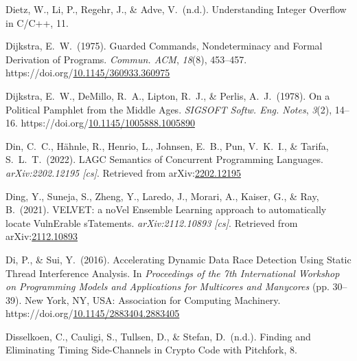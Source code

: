 \documentclass[12pt,twoside]{article}
\begin{document}
{\begin{thebibliography}{1079}
\mdbibitemlabel{}Dietz, W., Li, P., Regehr, J., \& Adve, V.~(n.d.). Understanding Integer Overﬂow in C/C++, 11.%

\mdbibitemlabel{}Dijkstra, E.~W.~(1975). Guarded Commands, Nondeterminacy and Formal Derivation of Programs. \emph{Commun. ACM}, \emph{18}(8), 453–457. https://doi.org/\href{https://dx.doi.org/10.1145/360933.360975}{10.1145/360933.360975}%

\mdbibitemlabel{}Dijkstra, E.~W., DeMillo, R.~A., Lipton, R.~J., \& Perlis, A.~J.~(1978). On a Political Pamphlet from the Middle Ages. \emph{SIGSOFT Softw. Eng. Notes}, \emph{3}(2), 14–16. https://doi.org/\href{https://dx.doi.org/10.1145/1005888.1005890}{10.1145/1005888.1005890}%

\mdbibitemlabel{}Din, C.~C., Hähnle, R., Henrio, L., Johnsen, E.~B., Pun, V.~K.~I., \& Tarifa, S.~L.~T.~(2022). LAGC Semantics of Concurrent Programming Languages. \emph{arXiv:2202.12195 {}[cs]}. Retrieved from arXiv:\href{http://arxiv.org/abs/2202.12195}{2202.12195}%

\mdbibitemlabel{}Ding, Y., Suneja, S., Zheng, Y., Laredo, J., Morari, A., Kaiser, G., \& Ray, B.~(2021). VELVET: a noVel Ensemble Learning approach to automatically locate VulnErable sTatements. \emph{arXiv:2112.10893 {}[cs]}. Retrieved from arXiv:\href{http://arxiv.org/abs/2112.10893}{2112.10893}%

\mdbibitemlabel{}Di, P., \& Sui, Y.~(2016). Accelerating Dynamic Data Race Detection Using Static Thread Interference Analysis. In \emph{Proceedings of the 7th International Workshop on Programming Models and Applications for Multicores and Manycores} (pp. 30–39). New York, NY, USA: Association for Computing Machinery. https://doi.org/\href{https://dx.doi.org/10.1145/2883404.2883405}{10.1145/2883404.2883405}%

\mdbibitemlabel{}Disselkoen, C., Cauligi, S., Tullsen, D., \& Stefan, D.~(n.d.). Finding and Eliminating Timing Side-Channels in Crypto Code with Pitchfork, 8.%


\end{thebibliography}}
\end{document}
